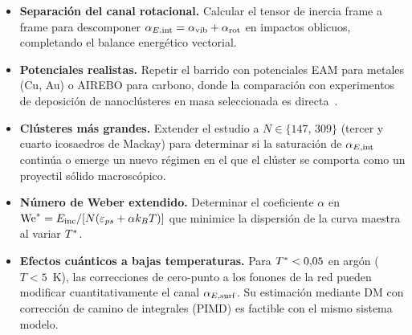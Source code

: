 \begin{itemize}

    \item \textbf{Separación del canal rotacional.}
    Calcular el tensor de inercia frame a frame para descomponer
    $\alpha_{E,\mathrm{int}} = \alpha_\mathrm{vib} + \alpha_\mathrm{rot}$
    en impactos oblicuos, completando el balance energético vectorial.

    \item \textbf{Potenciales realistas.}
    Repetir el barrido con potenciales EAM para metales (Cu, Au) o AIREBO
    para carbono, donde la comparación con experimentos de deposición de
    nanoclústeres en masa seleccionada es directa~\cite{haberland1995}.

    \item \textbf{Clústeres más grandes.}
    Extender el estudio a $N \in \{147,\, 309\}$ (tercer y cuarto icosaedros
    de Mackay) para determinar si la saturación de $\alpha_{E,\mathrm{int}}$ continúa o
    emerge un nuevo régimen en el que el clúster se comporta como un
    proyectil sólido macroscópico.

    \item \textbf{Número de Weber extendido.}
    Determinar el coeficiente $\alpha$ en $\mathrm{We}^* = E_{\mathrm{inc}} / [N(\varepsilon_{ps} + \alpha k_BT)]$
    que minimice la dispersión de la curva maestra al variar $T^{*}$.

    \item \textbf{Efectos cuánticos a bajas temperaturas.}
    Para $T^{*} < 0{,}05$ en argón ($T < 5$~K), las correcciones de
    cero-punto a los fonones de la red pueden modificar cuantitativamente
    el canal $\alpha_{E,\mathrm{surf}}$. Su estimación mediante DM con corrección de camino
    de integrales (PIMD) es factible con el mismo sistema modelo.

\end{itemize}
